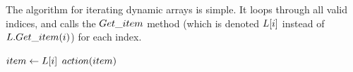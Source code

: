 \HdrDynArrayImpl

The algorithm for iterating dynamic arrays is simple. It loops through all valid indices, and calls the $Get\_item$ method (which is denoted $L[i]$ instead of $L.Get\_item(i)$) for each index.

\begin{algorithm}[H]
	\begin{algorithmic}
			\State $item \gets L[i]$
			\State $action(item)$
		\EndFor
	\end{algorithmic}
\end{algorithm}